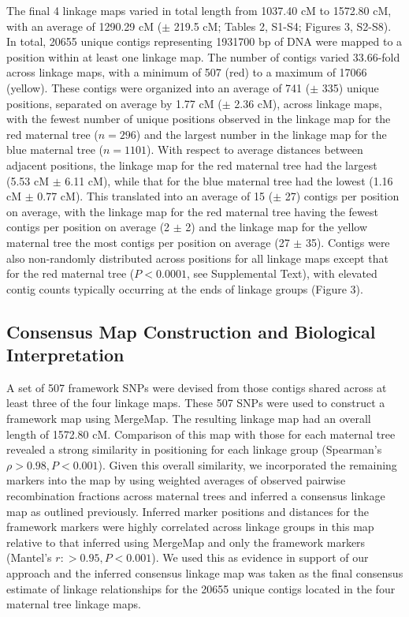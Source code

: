 \documentclass[smallextended]{svjour3}
\begin{document}
The final \num{4} linkage maps varied in total length from 1037.40 cM to 1572.80
cM, with an average of 1290.29 cM ($\pm$ 219.5 cM; Tables 2, S1-S4; Figures 3,
S2-S8).  In total, \num{20655} unique contigs representing \num{1931700} bp of
DNA were mapped to a position within at least one linkage map.  The number of
contigs varied 33.66-fold across linkage maps, with a minimum of 507 (red) to a
maximum of \num{17066} (yellow).  These contigs were organized into an average
of 741 ($\pm$ 335) unique positions, separated on average by 1.77 cM ($\pm$ 2.36
cM), across linkage maps, with the fewest number of unique positions observed in
the linkage map for the red maternal tree ($n = 296$) and the largest number in
the linkage map for the blue maternal tree ($n = 1101$). With respect to average
distances between adjacent positions, the linkage map for the red maternal tree
had the largest (5.53 cM $\pm$ 6.11 cM), while that for the blue maternal tree
had the lowest (1.16 cM $\pm$ 0.77 cM).  This translated into an average of 15
($\pm$ 27) contigs per position on average, with the linkage map for the red
maternal tree having the fewest contigs per position on average (2 $\pm$ 2) and
the linkage map for the yellow maternal tree the most contigs per position on
average (27 $\pm$ 35). Contigs were also non-randomly distributed across
positions for all linkage maps except that for the red maternal tree ($P <
0.0001$, see Supplemental Text), with elevated contig counts typically occurring
at the ends of linkage groups (Figure 3).

\subsection*{Consensus Map Construction and Biological Interpretation}

A set of 507 framework SNPs were devised from those contigs shared across at
least three of the four linkage maps. These 507 SNPs were used to construct a
framework map using MergeMap. The resulting linkage map had an overall length of
1572.80 cM. Comparison of this map with those for each maternal tree revealed a
strong similarity in positioning for each linkage group (Spearman's $\rho >
0.98, P < 0.001$).  Given this overall similarity, we incorporated the remaining
markers into the map by using weighted averages of observed pairwise
recombination fractions across maternal trees and inferred a consensus linkage
map as outlined previously. Inferred marker positions and distances for the
framework markers were highly correlated across linkage groups in this map
relative to that inferred using MergeMap and only the framework markers
(Mantel's $r: > 0.95, P < 0.001$). We used this as evidence in support of our
approach and the inferred consensus linkage map was taken as the final consensus
estimate of linkage relationships for the \num{20655} unique contigs located in
the four maternal tree linkage maps.
\end{document}
